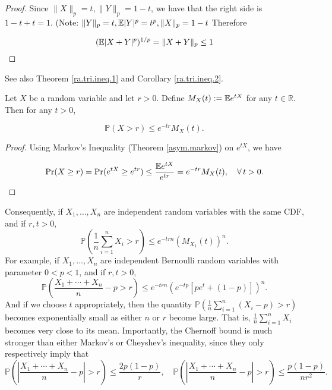 \begin{itemize}
\begin{itemize}
\begin{theorem}
\begin{proof}
Since \(\lVert X\rVert_p = t, \lVert Y \rVert_p=1-t\), we have that the right side is \(1 - t + t = 1\). (Note: \(\lVert Y\rVert_p = t, \mathbb{E}|Y|^p = t^p, \lVert X\rVert_p = 1-t\) Therefore

\[
(\mathbb{E}|X+Y|^p)^{1/p} = \lVert X+Y\rVert_p \leq 1
\]

\end{proof}

\begin{remark} See also Theorem \ref{ra.tri.ineq.1} and Corollary \ref{ra.tri.ineq.2}. \end{remark}

\end{theorem}
\end{itemize}

\end{itemize}

\begin{theorem}
Let $X$ be a random variable and let $r>0$.  Define $M_{X}(t):= \mathbb{E} e^{tX}$ for any $t\in\mathbb{R}$. Then for any $t>0$,

\[
\mathbb{P}(X>r)\leq e^{-tr}M_{X}(t).
\]

\end{theorem}

\begin{proof} Using Markov's Inequality (Theorem \ref{asym.markov}) on \(e^{tX}\), we have

\[
\Pr (X\geq r) = \Pr (e^{tX} \geq e^{t r}) \leq \frac{\E e^{tX}}{e^{t r}}  = e^{-tr}M_{X}(t), \ \ \ \forall\,t>0.
\]

\end{proof}

\begin{remark}Consequently, if $X_{1},\ldots,X_{n}$ are independent random variables with the same CDF, and if $r,t>0$,
$$\mathbb{P}\left(\frac{1}{n}\sum_{i=1}^{n}X_{i}>r\right)\leq e^{-trn}(M_{X_{1}}(t))^{n}.$$
For example, if $X_{1},\ldots,X_{n}$ are independent Bernoulli random variables with parameter $0<p<1$,  and if $r,t>0$,
$$\mathbb{P}\left(\frac{X_{1}+\cdots+X_{n}}{n}-p>r\right)\leq e^{-trn}( e^{-tp}[pe^{t}+(1-p)])^{n}.$$
And if we choose $t$ appropriately, then the quantity $\mathbb{P}\left(\frac{1}{n}\sum_{i=1}^{n}(X_{i}-p)>r\right)$ becomes exponentially small as either $n$ or $r$ become large.  That is, $\frac{1}{n}\sum_{i=1}^{n}X_{i}$ becomes very close to its mean.  Importantly, the Chernoff bound is much stronger than either Markov's or Cheyshev's inequality, since they only respectively imply that
$$\mathbb{P}\left( \left|\frac{X_{1}+\cdots+X_{n}}{n}-p \right|>r\right)\leq \frac{2p(1-p)}{r},   %
\quad\mathbb{P}\left(\left|\frac{X_{1}+\cdots+X_{n}}{n}-p \right|>r\right)\leq \frac{p(1-p)}{nr^{2}}.$$ %
\end{remark}

